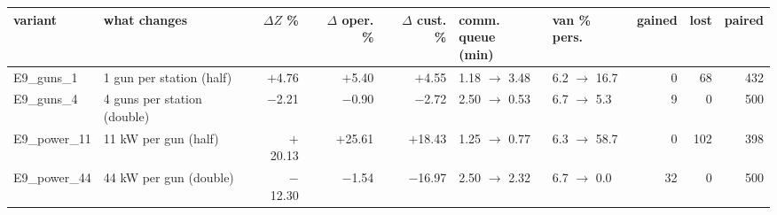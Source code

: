 \scriptsize
\begin{adjustbox}{max width=\linewidth}
\begin{tabular}{@{}llrrrllrrr@{}}
\toprule
variant & what changes & \shortstack{$\Delta Z$\\\%} & \shortstack{$\Delta$\\oper. \%} & \shortstack{$\Delta$\\cust. \%} & \shortstack{comm. queue\\(min)} & van \% pers. & gained & lost & paired \\
\midrule
E9\_guns\_1 & 1 gun per station (half) & $+$4.76 & $+$5.40 & $+$4.55 & 1.18 $\to$ 3.48 & 6.2 $\to$ 16.7 & 0 & 68 & 432 \\
E9\_guns\_4 & 4 guns per station (double) & $-$2.21 & $-$0.90 & $-$2.72 & 2.50 $\to$ 0.53 & 6.7 $\to$ 5.3 & 9 & 0 & 500 \\
E9\_power\_11 & 11 kW per gun (half) & $+$20.13 & $+$25.61 & $+$18.43 & 1.25 $\to$ 0.77 & 6.3 $\to$ 58.7 & 0 & 102 & 398 \\
E9\_power\_44 & 44 kW per gun (double) & $-$12.30 & $-$1.54 & $-$16.97 & 2.50 $\to$ 2.32 & 6.7 $\to$ 0.0 & 32 & 0 & 500 \\
\bottomrule
\end{tabular}
\end{adjustbox}

